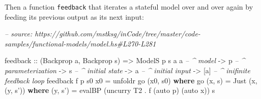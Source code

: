 \documentclass[]{article}
\newenvironment{Shaded}{}{}
\newcommand{\CommentTok}[1]{\textcolor[rgb]{0.38,0.63,0.69}{\textit{#1}}}
\newcommand{\DataTypeTok}[1]{\textcolor[rgb]{0.56,0.13,0.00}{#1}}
\newcommand{\FunctionTok}[1]{\textcolor[rgb]{0.02,0.16,0.49}{#1}}
\newcommand{\KeywordTok}[1]{\textcolor[rgb]{0.00,0.44,0.13}{\textbf{#1}}}
\newcommand{\NormalTok}[1]{#1}
\newcommand{\OtherTok}[1]{\textcolor[rgb]{0.00,0.44,0.13}{#1}}
\begin{document}
\begin{Shaded}
\end{Shaded}

Then a function \texttt{feedback} that iterates a stateful model over and over
again by feeding its previous output as its next input:

\begin{Shaded}
\begin{Highlighting}[]
\CommentTok{-- source: https://github.com/mstksg/inCode/tree/master/code-samples/functional-models/model.hs#L270-L281}

\NormalTok{feedback}
\OtherTok{    ::}\NormalTok{ (}\DataTypeTok{Backprop}\NormalTok{ a, }\DataTypeTok{Backprop}\NormalTok{ s)}
    \OtherTok{=>} \DataTypeTok{ModelS}\NormalTok{ p s a a     }\CommentTok{-- ^ model}
    \OtherTok{->}\NormalTok{ p                  }\CommentTok{-- ^ parameterization}
    \OtherTok{->}\NormalTok{ s                  }\CommentTok{-- ^ initial state}
    \OtherTok{->}\NormalTok{ a                  }\CommentTok{-- ^ initial input}
    \OtherTok{->}\NormalTok{ [a]                }\CommentTok{-- ^ inifinite feedback loop}
\NormalTok{feedback f p s0 x0 }\FunctionTok{=}\NormalTok{ unfoldr go (x0, s0)}
  \KeywordTok{where}
\NormalTok{    go (x, s) }\FunctionTok{=} \DataTypeTok{Just}\NormalTok{ (x, (y, s'))}
      \KeywordTok{where}
\NormalTok{        (y, s') }\FunctionTok{=}\NormalTok{ evalBP (uncurry }\DataTypeTok{T2} \FunctionTok{.}\NormalTok{ f (auto p) (auto x)) s}
\end{Highlighting}
\end{Shaded}
\end{document}
